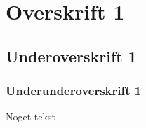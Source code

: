 \section{Overskrift 1}

\subsection{Underoverskrift 1}

\subsubsection{Underunderoverskrift 1}

Noget tekst
